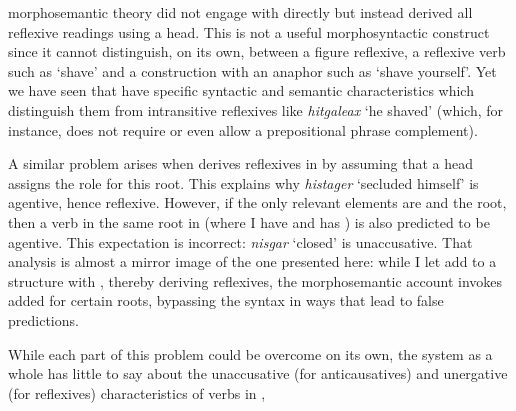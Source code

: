 \begin{exe}
\begin{xlist}
\begin{xlist}
\begin{exe}
\begin{xlist}
\begin{xlist}
\begin{exe}
\begin{xlist}
\begin{xlist}
\begin{exe}
\begin{exe}
\begin{xlist}
\begin{exe}
\begin{exe}
\begin{xlist}
\begin{exe}
\begin{exe}
\begin{exe}
\begin{exe}
\begin{exe}
\begin{xlist}
\begin{exe}
\begin{xlist}
\begin{exe}
\begin{exe}
\begin{xlist}
\begin{exe}
\begin{xlist}
\begin{exe}
\begin{xlist}
\begin{exe}
\begin{exe}
\begin{exe}
\begin{xlist}
\begin{exe}
\begin{exe}
\begin{exe}
\begin{xlist}
\begin{exe}
\begin{xlist}
\begin{exe}
\begin{exe}
\begin{xlist}
\begin{exe}
\begin{exe}
\begin{exe}
\begin{exe}
\begin{xlist}
\begin{exe}
\begin{xlist}
\begin{exe}
\begin{xlist}
\begin{exe}
\begin{xlist}
\begin{exe}
\begin{xlist}
\begin{exe}
\begin{xlist}
\begin{exe}
\begin{exe}
\begin{xlist}
\begin{exe}
\begin{xlist}
\begin{exe}
\begin{exe}
\begin{xlist}
\begin{exe}
\begin{xlist}
\begin{exe}
\begin{exe}
\begin{exe}
\begin{exe}
\begin{xlist}
\begin{xlist}
\begin{exe}
\begin{xlist}
\begin{exe}
\begin{exe}
\begin{exe}
\begin{xlist}
\begin{exe}
\begin{exe}
\begin{xlist}
\begin{exe}
\begin{exe}
\begin{exe}
\begin{xlist}
\begin{xlist}
\begin{exe}
\begin{xlist}
\begin{exe}
\begin{exe}
\begin{exe}
\begin{exe}
\begin{xlist}
\begin{exe}
\begin{xlist}
\begin{exe}
\begin{xlist}
\begin{exe}
\begin{xlist}
\begin{exe}
\begin{exe}
\begin{exe}
\begin{exe}
\begin{exe}
\begin{xlist}
\begin{exe}
\begin{xlist}
\begin{exe}
\begin{xlist}
\begin{xlist}
\begin{exe}
\begin{xlist}
\begin{exe}
\begin{xlist}
\begin{exe}
\begin{xlist}
morphosemantic theory did not engage with  directly but instead derived all reflexive readings using a  head. This is not a useful morphosyntactic construct since it cannot distinguish, on its own, between a figure reflexive, a reflexive verb such as `shave’ and a construction with an anaphor such as `shave yourself’. Yet we have seen that  have specific syntactic and semantic characteristics which distinguish them from intransitive reflexives like \emph{hitgaleax} `he shaved’ (which, for instance, does not require or even allow a prepositional phrase complement).

A similar problem arises when \citet[60]{doron03} derives reflexives in {\thit} by assuming that a head  assigns the  role for this root. This explains why \emph{histager} `secluded himself' is agentive, hence reflexive. However, if the only relevant elements are {\vz} and the root, then a verb in the same root in {\tnif} (where I have {\vz} and \citealt{doron03} has ) is also predicted to be agentive. This expectation is incorrect: \emph{nisgar} `closed' is unaccusative. That analysis is almost a mirror image of the one presented here: while I let {\va} add  to a structure with \vz, thereby deriving reflexives, the morphosemantic account invokes added  for certain roots, bypassing the syntax in ways that lead to false predictions.

While each part of this problem could be overcome on its own, the system as a whole has little to say about the unaccusative (for anticausatives) and unergative (for reflexives) characteristics of verbs in {\thit}, 
\end{xlist}
\end{exe}
\end{xlist}
\end{exe}
\end{xlist}
\end{exe}
\end{xlist}
\end{xlist}
\end{exe}
\end{xlist}
\end{exe}
\end{xlist}
\end{exe}
\end{exe}
\end{exe}
\end{exe}
\end{exe}
\end{xlist}
\end{exe}
\end{xlist}
\end{exe}
\end{xlist}
\end{exe}
\end{xlist}
\end{exe}
\end{exe}
\end{exe}
\end{exe}
\end{xlist}
\end{exe}
\end{xlist}
\end{xlist}
\end{exe}
\end{exe}
\end{exe}
\end{xlist}
\end{exe}
\end{exe}
\end{xlist}
\end{exe}
\end{exe}
\end{exe}
\end{xlist}
\end{exe}
\end{xlist}
\end{xlist}
\end{exe}
\end{exe}
\end{exe}
\end{exe}
\end{xlist}
\end{exe}
\end{xlist}
\end{exe}
\end{exe}
\end{xlist}
\end{exe}
\end{xlist}
\end{exe}
\end{exe}
\end{xlist}
\end{exe}
\end{xlist}
\end{exe}
\end{xlist}
\end{exe}
\end{xlist}
\end{exe}
\end{xlist}
\end{exe}
\end{xlist}
\end{exe}
\end{exe}
\end{exe}
\end{exe}
\end{xlist}
\end{exe}
\end{exe}
\end{xlist}
\end{exe}
\end{xlist}
\end{exe}
\end{exe}
\end{exe}
\end{xlist}
\end{exe}
\end{exe}
\end{exe}
\end{xlist}
\end{exe}
\end{xlist}
\end{exe}
\end{xlist}
\end{exe}
\end{exe}
\end{xlist}
\end{exe}
\end{xlist}
\end{exe}
\end{exe}
\end{exe}
\end{exe}
\end{exe}
\end{xlist}
\end{exe}
\end{exe}
\end{xlist}
\end{exe}
\end{exe}
\end{xlist}
\end{xlist}
\end{exe}
\end{xlist}
\end{xlist}
\end{exe}
\end{xlist}
\end{xlist}
\end{exe}
